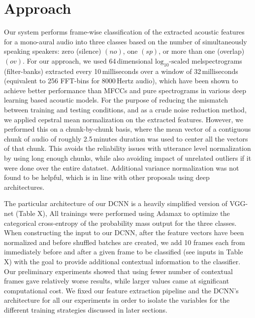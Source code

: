 \documentclass[a4paper]{article}
\begin{document}
\section{Approach}
Our system performs frame-wise classification of the extracted acoustic features for a mono-aural audio into three classes based on the number of simultaneously speaking speakers:
zero (silence) $(no)$, one $(sp)$, or more than one (overlap) $(ov)$.
For our approach, we used 64\,dimensional $\text{log}_{10} \text{-scaled}$ melspectrograms (filter-banks)
extracted every 10\,milliseconds over a window of 32\,milliseconds (equivalent to 256 FFT-bins for 8000\,Hertz audio),
which have been shown to achieve better performance than MFCCs and pure spectrograms in various deep learning based acoustic models.  %
For the purpose of reducing the mismatch between training and testing conditions, and as a crude noise reduction method,
we applied cepstral mean normalization on the extracted features.
However, we performed this on a chunk-by-chunk basis,
where the mean vector of a contiguous chunk of audio of roughly 2.5\,minutes duration was used to center all the vectors of that chunk.
This avoids the reliability issues with utterance level normalization by using long enough chunks,
while also avoiding impact of unrelated outliers if it were done over the entire datatset.
Additional variance normalization was not found to be helpful,
which is in line with other proposals using deep architectures.  %

The particular architecture of our DCNN is a heavily simplified version of VGG-net (Table X),  %
All trainings were performed using Adamax to optimize the categorical cross-entropy of the probability mass output for the three classes.
When constructing the input to our DCNN,
after the feature vectors have been normalized and before shuffled batches are created,
we add 10 frames each from immediately before and after a given frame to be classified (see inputs in Table X)  %
with the goal to provide additional contextual information to the classifier.
Our preliminary experiments showed that using fewer number of contextual frames gave relatively worse results,
while larger values came at significant computational cost.
We fixed our feature extraction pipeline and the DCNN's architecture for all our experiments in order to isolate the variables for the different training strategies discussed in later sections.
\end{document}
